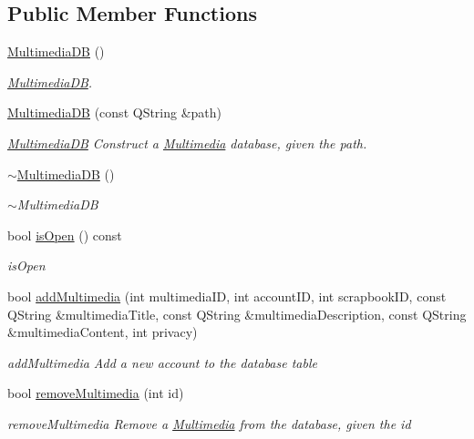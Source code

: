 \subsection*{Public Member Functions}
\begin{DoxyCompactItemize}
\item 
\hyperlink{classMultimediaDB_a048917175bd492882f859589b54bf0c0}{Multimedia\+DB} ()
\begin{DoxyCompactList}\small\item\em \hyperlink{classMultimediaDB}{Multimedia\+DB}. \end{DoxyCompactList}\item 
\hyperlink{classMultimediaDB_a208ee84fdeab0de7edf4765fcd0bc500}{Multimedia\+DB} (const Q\+String \&path)
\begin{DoxyCompactList}\small\item\em \hyperlink{classMultimediaDB}{Multimedia\+DB} Construct a \hyperlink{classMultimedia}{Multimedia} database, given the path. \end{DoxyCompactList}\item 
\hyperlink{classMultimediaDB_a29d25675487c38ab3c1a0bc5fafb1735}{$\sim$\+Multimedia\+DB} ()
\begin{DoxyCompactList}\small\item\em $\sim$\+Multimedia\+DB \end{DoxyCompactList}\item 
bool \hyperlink{classMultimediaDB_a39cd333257972ca8b52d836b7439688d}{is\+Open} () const 
\begin{DoxyCompactList}\small\item\em is\+Open \end{DoxyCompactList}\item 
bool \hyperlink{classMultimediaDB_acefba2ec9c7af4f640a8114983134310}{add\+Multimedia} (int multimedia\+ID, int account\+ID, int scrapbook\+ID, const Q\+String \&multimedia\+Title, const Q\+String \&multimedia\+Description, const Q\+String \&multimedia\+Content, int privacy)
\begin{DoxyCompactList}\small\item\em add\+Multimedia Add a new account to the database table \end{DoxyCompactList}\item 
bool \hyperlink{classMultimediaDB_ad701af61e1af3bb7ec7597929a7fd234}{remove\+Multimedia} (int id)
\begin{DoxyCompactList}\small\item\em remove\+Multimedia Remove a \hyperlink{classMultimedia}{Multimedia} from the database, given the id \end{DoxyCompactList}\item 

\end{DoxyCompactItemize}

